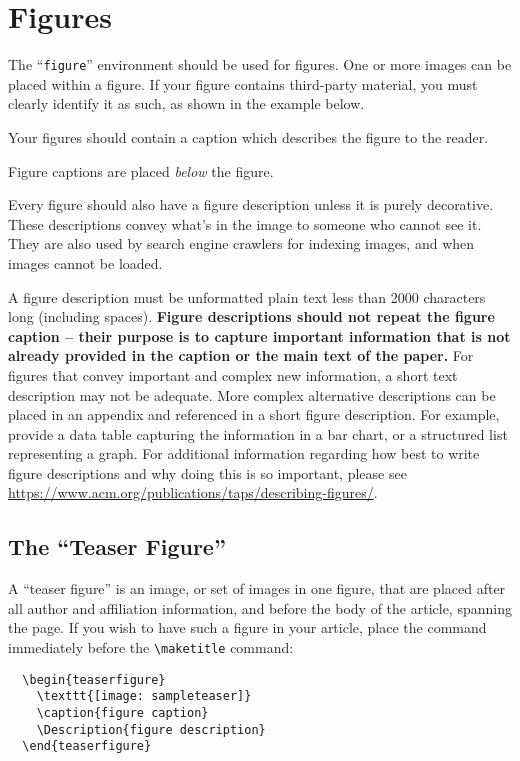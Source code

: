 \documentclass[sigconf,authordraft]{acmart}
\begin{document}
\section{Figures}

The ``\verb|figure|'' environment should be used for figures. One or
more images can be placed within a figure. If your figure contains
third-party material, you must clearly identify it as such, as shown
in the example below.

Your figures should contain a caption which describes the figure to
the reader.

Figure captions are placed {\itshape below} the figure.

Every figure should also have a figure description unless it is purely
decorative. These descriptions convey what’s in the image to someone
who cannot see it. They are also used by search engine crawlers for
indexing images, and when images cannot be loaded.

A figure description must be unformatted plain text less than 2000
characters long (including spaces).  {\bfseries Figure descriptions
  should not repeat the figure caption – their purpose is to capture
  important information that is not already provided in the caption or
  the main text of the paper.} For figures that convey important and
complex new information, a short text description may not be
adequate. More complex alternative descriptions can be placed in an
appendix and referenced in a short figure description. For example,
provide a data table capturing the information in a bar chart, or a
structured list representing a graph.  For additional information
regarding how best to write figure descriptions and why doing this is
so important, please see
\url{https://www.acm.org/publications/taps/describing-figures/}.

\subsection{The ``Teaser Figure''}

A ``teaser figure'' is an image, or set of images in one figure, that
are placed after all author and affiliation information, and before
the body of the article, spanning the page. If you wish to have such a
figure in your article, place the command immediately before the
\verb|\maketitle| command:
\begin{verbatim}
  \begin{teaserfigure}
    \texttt{[image: sampleteaser]}
    \caption{figure caption}
    \Description{figure description}
  \end{teaserfigure}
\end{verbatim}
\end{document}
